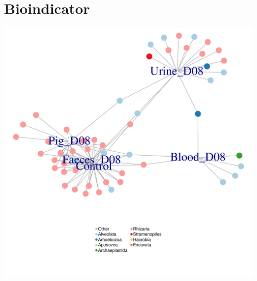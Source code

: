 \documentclass[11pt,english]{article}\usepackage[]{graphicx}\usepackage{xcolor}
\makeatletter
\def\maxwidth{ %
  \ifdim\Gin@nat@width>\linewidth
    \linewidth
  \else
    \Gin@nat@width
  \fi
}
\newenvironment{knitrout}{}{} %
\makeatother
\begin{document}
% 






\section{Bioindicator}



\begin{knitrout}
\color{fgcolor}
\includegraphics[width=\maxwidth]{figure/image-bioinc_08-1} 

\end{knitrout}
\end{document}
